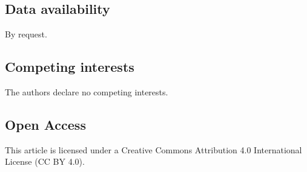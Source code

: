 \documentclass[12pt]{article}
\begin{document}
\subsection*{Data availability}
By request.

\subsection*{Competing interests}
The authors declare no competing interests.

\subsection*{Open Access}
This article is licensed under a Creative Commons Attribution 4.0 International License (CC BY 4.0).

\end{document}
